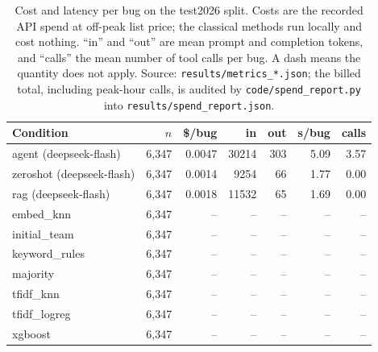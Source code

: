 \begin{table}[t]\centering
\small
\caption{Cost and latency per bug on the test2026 split. Costs are the recorded API spend at off-peak list price; the classical methods run locally and cost nothing. ``in'' and ``out'' are mean prompt and completion tokens, and ``calls'' the mean number of tool calls per bug. A dash means the quantity does not apply. Source: \texttt{results/metrics\_*.json}; the billed total, including peak-hour calls, is audited by \texttt{code/spend\_report.py} into \texttt{results/spend\_report.json}.}
\label{tab:cost-test2026}
\begin{tabular}{lrrrrrr}
\toprule
Condition & $n$ & \$/bug & in & out & s/bug & calls \\
\midrule
agent (deepseek-flash) & 6{,}347 & 0.0047 & 30214 & 303 & 5.09 & 3.57 \\
zeroshot (deepseek-flash) & 6{,}347 & 0.0014 & 9254 & 66 & 1.77 & 0.00 \\
rag (deepseek-flash) & 6{,}347 & 0.0018 & 11532 & 65 & 1.69 & 0.00 \\
embed\_knn & 6{,}347 & -- & -- & -- & -- & -- \\
initial\_team & 6{,}347 & -- & -- & -- & -- & -- \\
keyword\_rules & 6{,}347 & -- & -- & -- & -- & -- \\
majority & 6{,}347 & -- & -- & -- & -- & -- \\
tfidf\_knn & 6{,}347 & -- & -- & -- & -- & -- \\
tfidf\_logreg & 6{,}347 & -- & -- & -- & -- & -- \\
xgboost & 6{,}347 & -- & -- & -- & -- & -- \\
\bottomrule
\end{tabular}
\end{table}

